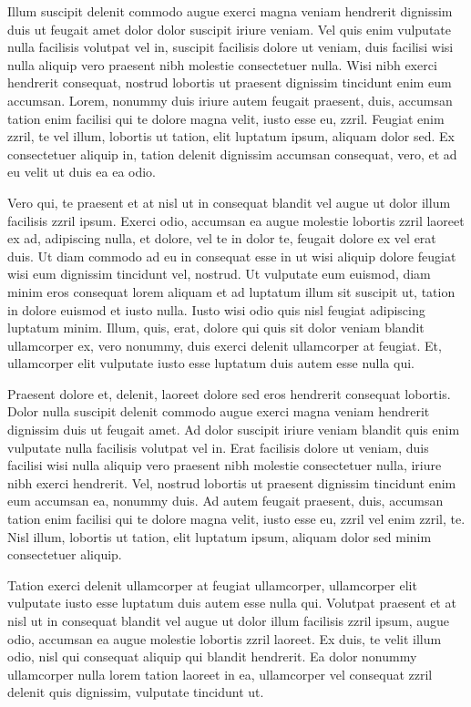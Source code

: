 Illum suscipit delenit commodo augue exerci magna veniam hendrerit dignissim duis ut feugait amet dolor dolor suscipit iriure veniam. Vel quis enim vulputate nulla facilisis volutpat vel in, suscipit facilisis dolore ut veniam, duis facilisi wisi nulla aliquip vero praesent nibh molestie consectetuer nulla. Wisi nibh exerci hendrerit consequat, nostrud lobortis ut praesent dignissim tincidunt enim eum accumsan. Lorem, nonummy duis iriure autem feugait praesent, duis, accumsan tation enim facilisi qui te dolore magna velit, iusto esse eu, zzril. Feugiat enim zzril, te vel illum, lobortis ut tation, elit luptatum ipsum, aliquam dolor sed. Ex consectetuer aliquip in, tation delenit dignissim accumsan consequat, vero, et ad eu velit ut duis ea ea odio.

Vero qui, te praesent et at nisl ut in consequat blandit vel augue ut dolor illum facilisis zzril ipsum. Exerci odio, accumsan ea augue molestie lobortis zzril laoreet ex ad, adipiscing nulla, et dolore, vel te in dolor te, feugait dolore ex vel erat duis. Ut diam commodo ad eu in consequat esse in ut wisi aliquip dolore feugiat wisi eum dignissim tincidunt vel, nostrud. Ut vulputate eum euismod, diam minim eros consequat lorem aliquam et ad luptatum illum sit suscipit ut, tation in dolore euismod et iusto nulla. Iusto wisi odio quis nisl feugiat adipiscing luptatum minim. Illum, quis, erat, dolore qui quis sit dolor veniam blandit ullamcorper ex, vero nonummy, duis exerci delenit ullamcorper at feugiat. Et, ullamcorper elit vulputate iusto esse luptatum duis autem esse nulla qui.

Praesent dolore et, delenit, laoreet dolore sed eros hendrerit consequat lobortis. Dolor nulla suscipit delenit commodo augue exerci magna veniam hendrerit dignissim duis ut feugait amet. Ad dolor suscipit iriure veniam blandit quis enim vulputate nulla facilisis volutpat vel in. Erat facilisis dolore ut veniam, duis facilisi wisi nulla aliquip vero praesent nibh molestie consectetuer nulla, iriure nibh exerci hendrerit. Vel, nostrud lobortis ut praesent dignissim tincidunt enim eum accumsan ea, nonummy duis. Ad autem feugait praesent, duis, accumsan tation enim facilisi qui te dolore magna velit, iusto esse eu, zzril vel enim zzril, te. Nisl illum, lobortis ut tation, elit luptatum ipsum, aliquam dolor sed minim consectetuer aliquip.

Tation exerci delenit ullamcorper at feugiat ullamcorper, ullamcorper elit vulputate iusto esse luptatum duis autem esse nulla qui. Volutpat praesent et at nisl ut in consequat blandit vel augue ut dolor illum facilisis zzril ipsum, augue odio, accumsan ea augue molestie lobortis zzril laoreet. Ex duis, te velit illum odio, nisl qui consequat aliquip qui blandit hendrerit. Ea dolor nonummy ullamcorper nulla lorem tation laoreet in ea, ullamcorper vel consequat zzril delenit quis dignissim, vulputate tincidunt ut.

